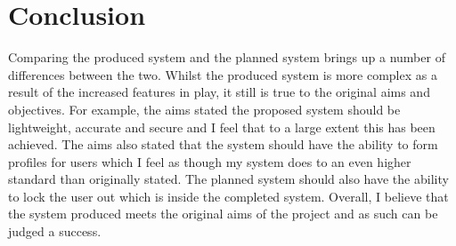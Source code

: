 \documentclass[10pt,a4paper]{report}
\begin{document}
\chapter{Conclusion}

Comparing the produced system and the planned system brings up a number of differences between the two. Whilst the produced system is more complex as a result of the increased features in play, it still is true to the original aims and objectives. For example, the aims stated the proposed system should be lightweight, accurate and secure and I feel that to a large extent this has been achieved. The aims also stated that the system should have the ability to form profiles for users which I feel as though my system does to an even higher standard than originally stated. The planned system should also have the ability to lock the user out which is inside the completed system. Overall, I believe that the system produced meets the original aims of the project and as such can be judged a success.



\end{document}

